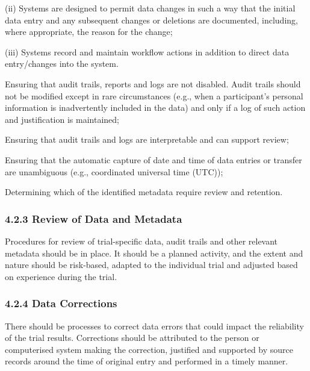 \documentclass[11pt]{article}
\begin{document}
(ii) Systems are designed to permit data changes in such a way that the initial data entry and any subsequent changes or deletions are documented, including, where appropriate, the reason for the change;


(iii) Systems record and maintain workflow actions in addition to direct data entry/changes into the system.


\begin{description}[leftmargin=2.5cm,style=sameline]

\item[(b)] Ensuring that audit trails, reports and logs are not disabled. Audit trails should not be modified except in rare circumstances (e.g., when a participant's personal information is inadvertently included in the data) and only if a log of such action and justification is maintained;

\item[(c)] Ensuring that audit trails and logs are interpretable and can support review;

\item[(d)] Ensuring that the automatic capture of date and time of data entries or transfer are unambiguous (e.g., coordinated universal time (UTC));

\item[(e)] Determining which of the identified metadata require review and retention.

\end{description}

\subsubsection{4.2.3 Review of Data and Metadata}

Procedures for review of trial-specific data, audit trails and other relevant metadata should be in place. It should be a planned activity, and the extent and nature should be risk-based, adapted to the individual trial and adjusted based on experience during the trial.


\subsubsection{4.2.4 Data Corrections}

There should be processes to correct data errors that could impact the reliability of the trial results. Corrections should be attributed to the person or computerised system making the correction, justified and supported by source records around the time of original entry and performed in a timely manner.
\end{document}
